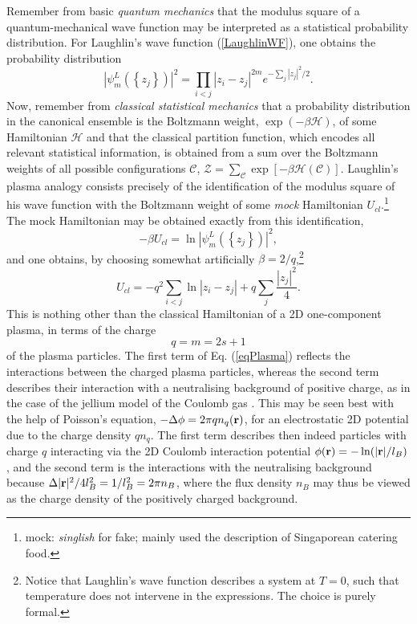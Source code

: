 \documentclass[10pt]{book}
\newcommand{\br}{{\bf r}}
\newcommand{\Hmath}{\mathcal{H}}
\newcommand{\Cmath}{\mathcal{C}}
\newcommand{\Zmath}{\mathcal{Z}}
\newcommand{\beq}{\begin{equation}}
\newcommand{\eeq}{\end{equation}}
\begin{document}
Remember from basic {\sl quantum mechanics} that the modulus square of a quantum-mechanical wave function may be interpreted as a 
statistical probability distribution. For Laughlin's wave function (\ref{LaughlinWF}), one obtains the
probability distribution
$$
\left|\psi_{m}^L\left(\left\{z_j\right\}\right)\right|^2=
\prod_{i<j}\left|z_i-z_j\right|^{2m} e^{-\sum_j|z_j|^2/2}.
$$
Now, remember from {\sl classical statistical mechanics} that a probability distribution in the canonical ensemble
is the Boltzmann weight, $\exp(-\beta\Hmath)$, of some Hamiltonian $\Hmath$ and that the classical partition function,
which encodes all relevant statistical information, is obtained from a sum over the Boltzmann weights of all possible
configurations $\Cmath$, $\Zmath=\sum_{\Cmath}\exp[-\beta\Hmath(\Cmath)]$. Laughlin's plasma analogy consists precisely
of the identification of the modulus square of his wave function with the Boltzmann weight of some {\sl mock} Hamiltonian
$U_{cl}$.\footnote{mock: {\sl singlish} for fake; mainly used the description of Singaporean catering food.}
The mock Hamiltonian may be obtained exactly from this identification,
\beq\label{PlasmaAnal}
-\beta U_{cl}=\ln\left|\psi_{m}^L\left(\left\{z_j\right\}\right)\right|^2,
\eeq
and one obtains, by choosing somewhat artificially $\beta=2/q$,\footnote{Notice that Laughlin's wave function describes 
a system at $T=0$, such that temperature does not intervene in the expressions. The choice is purely formal.}
\beq\label{eqPlasma}
U_{cl}=-q^2\sum_{i<j}\ln\left|z_i-z_j\right|+q\sum_j \frac{|z_j|^2}{4}.
\eeq
This is nothing other than the classical Hamiltonian of a 2D one-component plasma, in terms of the charge
\beq\label{plasmaQ}
q=m=2s+1
\eeq
of the plasma particles. The first term of Eq. (\ref{eqPlasma}) reflects the interactions between the charged plasma particles,
whereas the second term describes their interaction with a neutralising background of positive charge, as in the case of the
jellium model of the Coulomb gas \cite{mahan,GV}. This may be seen best with the help of Poisson's equation, $-\Delta \phi=
2\pi q n_q(\br)$, for an electrostatic 2D potential due to the charge density $qn_{q}$. The first term describes then indeed
particles with charge $q$ interacting via the 2D Coulomb interaction potential $\phi(\br)= - \ln(|\br|/l_B)$, and the second
term is the interactions with the neutralising background because $\Delta |\br|^2/4l_B^2 = 1/l_B^2=2\pi n_{B}$, where the 
flux density $n_B$ may thus be viewed as the charge density of the positively charged background. 
\end{document}
